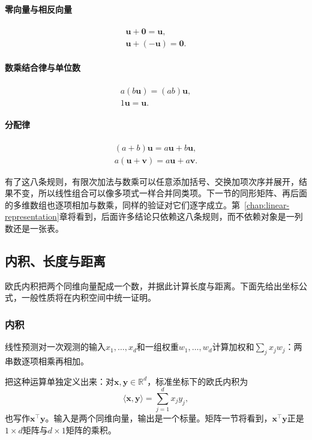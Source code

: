 \paragraph{零向量与相反向量}
\[
 \begin{gathered}
 \bm u+\bm0=\bm u,\\
 \bm u+(-\bm u)=\bm0.
 \end{gathered}
\]

\paragraph{数乘结合律与单位数}
\[
 \begin{gathered}
 a(b\bm u)=(ab)\bm u,\\
 1\bm u=\bm u.
 \end{gathered}
\]

\paragraph{分配律}
\[
 \begin{gathered}
 (a+b)\bm u=a\bm u+b\bm u,\\
 a(\bm u+\bm v)=a\bm u+a\bm v.
 \end{gathered}
\]

有了这八条规则，有限次加法与数乘可以任意添加括号、交换加项次序并展开，结果不变，所以线性组合可以像多项式一样合并同类项。下一节的同形矩阵、再后面的多维数组也逐项相加与数乘，同样的验证对它们逐字成立。第~\ref{chap:linear-representation}章将看到，后面许多结论只依赖这八条规则，而不依赖对象是一列数还是一张表。

\subsection{内积、长度与距离}

欧氏内积把两个同维向量配成一个数，并据此计算长度与距离。下面先给出坐标公式，一般性质将在内积空间中统一证明。

\subsubsection{内积}
\label{sec:ls-inner-products}
\label{sec:prelim-vector-inner-length}

线性预测对一次观测的输入$x_1,\ldots,x_d$和一组权重$w_1,\ldots,w_d$计算加权和$\sum_jx_jw_j$：两串数逐项相乘再相加。

把这种运算单独定义出来：对$\bm x,\bm y\in\mathbb R^d$，标准坐标下的欧氏内积为
\[
 \langle\bm x,\bm y\rangle
 =\sum_{j=1}^d x_jy_j,
\]
也写作$\bm x^\top\bm y$。输入是两个同维向量，输出是一个标量。矩阵一节将看到，$\bm x^\top\bm y$正是$1\times d$矩阵与$d\times1$矩阵的乘积。

